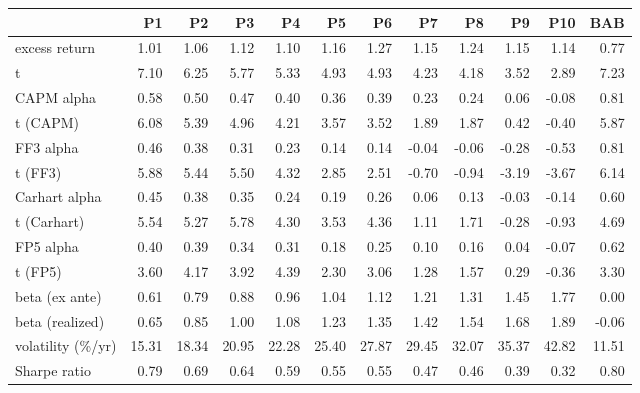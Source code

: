 \begin{tabular}{lrrrrrrrrrrr}
\toprule
 & P1 & P2 & P3 & P4 & P5 & P6 & P7 & P8 & P9 & P10 & BAB \\
\midrule
excess return & 1.01 & 1.06 & 1.12 & 1.10 & 1.16 & 1.27 & 1.15 & 1.24 & 1.15 & 1.14 & 0.77 \\
  t & 7.10 & 6.25 & 5.77 & 5.33 & 4.93 & 4.93 & 4.23 & 4.18 & 3.52 & 2.89 & 7.23 \\
CAPM alpha & 0.58 & 0.50 & 0.47 & 0.40 & 0.36 & 0.39 & 0.23 & 0.24 & 0.06 & -0.08 & 0.81 \\
  t (CAPM) & 6.08 & 5.39 & 4.96 & 4.21 & 3.57 & 3.52 & 1.89 & 1.87 & 0.42 & -0.40 & 5.87 \\
FF3 alpha & 0.46 & 0.38 & 0.31 & 0.23 & 0.14 & 0.14 & -0.04 & -0.06 & -0.28 & -0.53 & 0.81 \\
  t (FF3) & 5.88 & 5.44 & 5.50 & 4.32 & 2.85 & 2.51 & -0.70 & -0.94 & -3.19 & -3.67 & 6.14 \\
Carhart alpha & 0.45 & 0.38 & 0.35 & 0.24 & 0.19 & 0.26 & 0.06 & 0.13 & -0.03 & -0.14 & 0.60 \\
  t (Carhart) & 5.54 & 5.27 & 5.78 & 4.30 & 3.53 & 4.36 & 1.11 & 1.71 & -0.28 & -0.93 & 4.69 \\
FP5 alpha & 0.40 & 0.39 & 0.34 & 0.31 & 0.18 & 0.25 & 0.10 & 0.16 & 0.04 & -0.07 & 0.62 \\
  t (FP5) & 3.60 & 4.17 & 3.92 & 4.39 & 2.30 & 3.06 & 1.28 & 1.57 & 0.29 & -0.36 & 3.30 \\
beta (ex ante) & 0.61 & 0.79 & 0.88 & 0.96 & 1.04 & 1.12 & 1.21 & 1.31 & 1.45 & 1.77 & 0.00 \\
beta (realized) & 0.65 & 0.85 & 1.00 & 1.08 & 1.23 & 1.35 & 1.42 & 1.54 & 1.68 & 1.89 & -0.06 \\
volatility (\%/yr) & 15.31 & 18.34 & 20.95 & 22.28 & 25.40 & 27.87 & 29.45 & 32.07 & 35.37 & 42.82 & 11.51 \\
Sharpe ratio & 0.79 & 0.69 & 0.64 & 0.59 & 0.55 & 0.55 & 0.47 & 0.46 & 0.39 & 0.32 & 0.80 \\
\bottomrule
\end{tabular}
